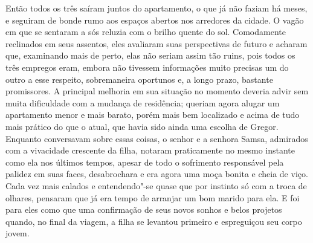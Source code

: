 Então todos os três saíram juntos do apartamento, o que já não faziam há
meses, e seguiram de bonde rumo aos espaços abertos nos arredores da
cidade. O vagão em que se sentaram a sós reluzia com o brilho quente do
sol. Comodamente reclinados em seus assentos, eles avaliaram suas
perspectivas de futuro e acharam que, examinando mais de perto, elas não
seriam assim tão ruins, pois todos os três empregos eram, embora não
tivessem informações muito precisas um do outro a esse respeito,
sobremaneira oportunos e, a longo prazo, bastante promissores. A principal
melhoria em sua situação no momento deveria advir sem muita dificuldade
com a mudança de residência; queriam agora alugar um apartamento menor e
mais barato, porém mais bem localizado e acima de tudo mais prático do que
o atual, que havia sido ainda uma escolha de Gregor. Enquanto conversavam
sobre essas coisas, o senhor e a senhora Samsa, admirados com a vivacidade
crescente da filha, notaram praticamente no mesmo instante como ela nos
últimos tempos, apesar de todo o sofrimento responsável pela palidez em
suas faces, desabrochara e era agora uma moça bonita e cheia de viço. Cada
vez mais calados e entendendo"-se quase que por instinto só com a troca de
olhares, pensaram que já era tempo de arranjar um bom marido para ela. E
foi para eles como que uma confirmação de seus novos sonhos e belos
projetos quando, no final da viagem, a filha se levantou primeiro e
espreguiçou seu corpo jovem.
